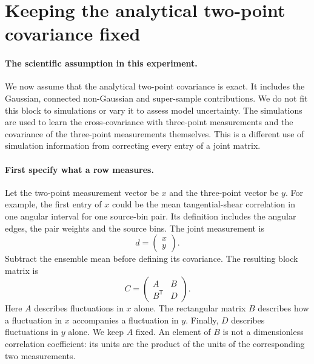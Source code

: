 \section{Keeping the analytical two-point covariance fixed}
\label{sec:fixed-two-point}
\paragraph{The scientific assumption in this experiment.}
We now assume that the analytical two-point covariance is exact. It includes
the Gaussian, connected non-Gaussian and super-sample contributions. We do
not fit this block to simulations or vary it to assess model uncertainty.
The simulations are used to learn the cross-covariance with three-point
measurements and the covariance of the three-point measurements themselves.
This is a different use of simulation information from correcting every
entry of a joint matrix.

\paragraph{First specify what a row measures.}
Let the two-point measurement vector be $x$ and the three-point vector be $y$.
For example, the first entry of $x$ could be the mean tangential-shear
correlation in one angular interval for one source-bin pair. Its definition
includes the angular edges, the pair weights and the source bins. The joint
measurement is
\begin{equation}
 d=\begin{pmatrix}x\\y\end{pmatrix}.
\end{equation}
Subtract the ensemble mean before defining its covariance. The resulting
block matrix is
\begin{equation}
 C=\begin{pmatrix}A&B\\B^{\mathsf T}&D\end{pmatrix}.
\end{equation}
Here $A$ describes fluctuations in $x$ alone. The rectangular matrix $B$
describes how a fluctuation in $x$ accompanies a fluctuation in $y$. Finally,
$D$ describes fluctuations in $y$ alone. We keep $A$ fixed. An element of
$B$ is not a dimensionless correlation coefficient: its units are the
product of the units of the corresponding two measurements.

